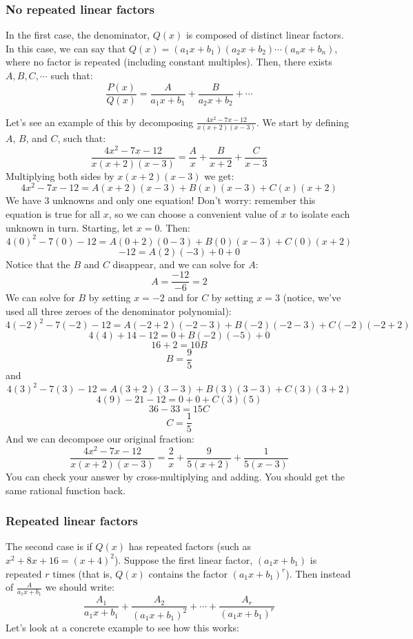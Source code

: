 \subsubsection{No repeated linear factors}
In the first case, the denominator, $Q(x)$ is composed of distinct linear 
factors. In this case, we can say that $Q(x) = (a_1x + b_1)(a_2x + b_2) \cdots 
(a_nx + b_n)$, where no factor is repeated (including constant multiples). 
Then, there exists $A, B, C, \cdots$ such that:
$$\frac{P(x)}{Q(x)} = \frac{A}{a_1x+b_1} + \frac{B}{a_2x + b_2} + \cdots$$

Let's see an example of this by decomposing $\frac{4x^2 - 7x - 12}{x (x + 2) (x 
- 3)}$. We start by defining $A$, $B$, and $C$, such that:
$$\frac{4x^2 - 7x - 12}{x (x + 2) (x - 3)} = \frac{A}{x} + \frac{B}{x + 2} + 
\frac{C}{x - 3}$$
Multiplying both sides by $x (x + 2) (x - 3)$ we get:
$$4x^2 - 7x - 12 = A(x + 2)(x - 3) + B(x)(x - 3) + C(x)(x + 2)$$
We have 3 unknowns and only one equation! Don't worry: remember this equation 
is true for all $x$, so we can choose a convenient value of $x$ to isolate 
each unknown in turn. Starting, let $x = 0$. Then:
$$4(0)^2 - 7(0) - 12 = A(0 + 2)(0 - 3) + B(0)(x - 3) + C(0)(x + 2)$$
$$-12 = A(2)(-3) + 0 + 0$$
Notice that the $B$ and $C$ disappear, and we can solve for $A$:
$$A = \frac{-12}{-6} = 2$$
We can solve for $B$ by setting $x = -2$ and for $C$ by setting $x = 3$ 
(notice, we've used all three zeroes of the denominator polynomial):
$$4(-2)^2 - 7(-2) - 12 = A(-2 + 2)(-2 - 3) + B(-2)(-2 - 3) + C(-2)(-2 + 2)$$
$$4(4) + 14 - 12 = 0 + B(-2)(-5) + 0$$
$$16 + 2 = 10B$$
$$B = \frac{9}{5}$$
and
$$4(3)^2 - 7(3) - 12 = A(3 + 2)(3 - 3) + B(3)(3 - 3) + C(3)(3 + 2)$$
$$4(9) - 21 - 12 = 0 + 0 + C(3)(5)$$
$$36 - 33 = 15C$$
$$C = \frac{1}{5}$$
And we can decompose our original fraction:
$$\frac{4x^2 - 7x - 12}{x (x + 2) (x - 3)} = \frac{2}{x} + \frac{9}{5(x + 2)} 
+ \frac{1}{5(x - 3)}$$
You can check your answer by cross-multiplying and adding. You should get the 
same rational function back. 

\subsubsection{Repeated linear factors}
The second case is if $Q(x)$ has repeated factors (such as $x^2 + 8x + 16 = (x 
+ 4)^2$). Suppose the first linear factor, $(a_1x + b_1)$ is repeated $r$ 
times (that is, $Q(x)$ contains the factor $(a_1x + b_1)^r$). Then instead of 
$\frac{A}{a_1x + b_1}$ we should write:
$$\frac{A_1}{a_1x + b_1} + \frac{A_2}{(a_1x + b_1)^2} + \cdots + \frac{A_r}{(
a_1x + b_1)^r}$$
Let's look at a concrete example to see how this works:

